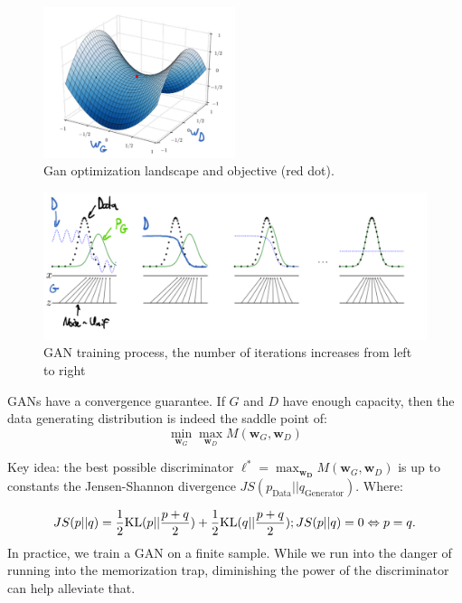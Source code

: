 \documentclass[a4paper,10pt,twoside]{article}
\begin{document}
\begin{figure}
  \centering
  \includegraphics[width=0.5\textwidth]{figures/GAN_optim_landscape.png}
  \caption{Gan optimization landscape and objective (red dot).}
  \label{fig:gan_optim_landscape}
\end{figure}

\begin{figure}
  \centering
  \includegraphics[width=.8\textwidth]{figures/GAN_training_process.png}
  \caption{GAN training process, the number of iterations increases from left to right}
  \label{fig:gan_iterations}
\end{figure}

GANs have a convergence guarantee. If $G$ and $D$ have enough capacity, then the data generating distribution is indeed the saddle point of:
\begin{equation*}
  \min_{\mathbf{w}_G}\max_{\mathbf{w}_D}M(\mathbf{w}_G,\mathbf{w}_D)
\end{equation*}

Key idea: the best possible discriminator $\ell^*=\max_{\mathbf{w_D}}M(\mathbf{w}_G,\mathbf{w}_D)$ is up to constants the Jensen-Shannon divergence $JS(p_{\text{Data}}||q_{\text{Generator}})$. Where:

\begin{equation*}
  JS(p||q) = {1\over 2}\text{KL}(p||{p+q\over 2})+{1\over 2}\text{KL}(q||{p+q\over 2}); JS(p||q)=0\Leftrightarrow p=q.
\end{equation*}
 In practice, we train a GAN on a finite sample. While we run into the danger of running into the memorization trap, diminishing the power of the discriminator can help alleviate that.
\end{document}
